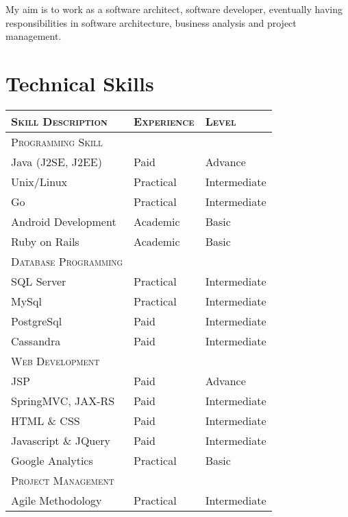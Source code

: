 \documentclass[a4paper,10pt]{article} %
\begin{document}
My aim is to work as a software architect, software developer, eventually having responsibilities in software architecture, business analysis and project management.


\section{Technical Skills}

    \begin{tabular}{l|l|l}
   
    \textsc{Skill Description} & \textsc{Experience}  & \textsc{Level} \\ \hline
    \textsc{Programming Skill}\\ \hline
    Java (J2SE, J2EE) & Paid & Advance \\
    Unix/Linux & Practical & Intermediate \\ 
    Go & Practical & Intermediate \\
    Android Development & Academic & Basic\\
    Ruby on Rails & Academic & Basic \\ 
    \hline 
    \textsc{Database Programming} \\ \hline
    SQL Server & Practical & Intermediate \\ 
    MySql & Practical & Intermediate \\ 
    PostgreSql & Paid & Intermediate \\ 
    Cassandra & Paid & Intermediate \\ \hline
    \textsc{Web Development} \\ \hline
    JSP & Paid & Advance \\ 
    SpringMVC, JAX-RS & Paid & Intermediate \\ 
    HTML \& CSS & Paid & Intermediate \\ 
    Javascript \& JQuery & Paid & Intermediate \\
    Google Analytics & Practical & Basic \\ 
    \hline
    \textsc{Project Management}\\ \hline
    Agile Methodology & Practical & Intermediate \\ 
    \end{tabular}
\end{document}
